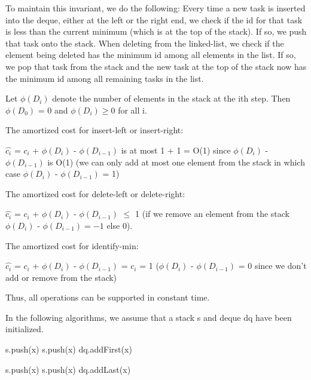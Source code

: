 \documentclass[11pt,a4paper]{article}
\begin{document}
To maintain this invariant, we do the following: Every time a new task is inserted into the deque, either at the left or the right end, we check if the id for that task is less than the current minimum (which is at the top of the stack). If so, we push that task onto the stack. When deleting from the linked-list, we check if the element being deleted has the minimum id among all elements in the list. If so, we pop that task from the stack and the new task at the top of the stack now has the minimum id among all remaining tasks in the list.


Let $\phi(D_{i})$ denote the number of elements in the stack at the ith step. Then $\phi(D_{0})$ = 0 and $\phi(D_{i}) \geq 0$ for all i.

The amortized cost for insert-left or insert-right:

$\hat{c_{i}}$ = $c_{i}$ + $\phi(D_{i})$ - $\phi(D_{i-1})$ is at most 1 + 1 = O(1) since $\phi(D_{i})$ - $\phi(D_{i-1})$ is O(1) (we can only add at most one element from the stack in which case $\phi(D_{i})$ - $\phi(D_{i-1})$ = 1)

The amortized cost for delete-left or delete-right:

$\hat{c_{i}}$ = $c_{i}$ + $\phi(D_{i})$ - $\phi(D_{i-1})$ $\leq$ 1 (if we remove an element from the stack $\phi(D_{i})$ - $\phi(D_{i-1}) = -1$ else 0).

The amortized cost for identify-min:

$\hat{c_{i}}$ = $c_{i}$ + $\phi(D_{i})$ - $\phi(D_{i-1})$ = $c_{i}$ = 1 ($\phi(D_{i})$ - $\phi(D_{i-1})$ = 0 since we don't add or remove from the stack)

Thus, all operations can be supported in constant time.

 
In the following algorithms, we assume that a stack s and deque dq have been initialized.
\begin{algorithm}
	\begin{algorithmic}[1]
			\State s.push(x)
		\EndIf
	\Else {}   
		\State s.push(x)
	\EndIf
	\State dq.addFirst(x)
	\EndFunction
	\end{algorithmic}
	\end{algorithm}
	
\begin{algorithm}
	\begin{algorithmic}[1]
			\State s.push(x)
		\EndIf
	\Else {}   
		\State s.push(x)
	\EndIf
	\State dq.addLast(x)
	\EndFunction
	\end{algorithmic}
	\end{algorithm}
\end{document}
